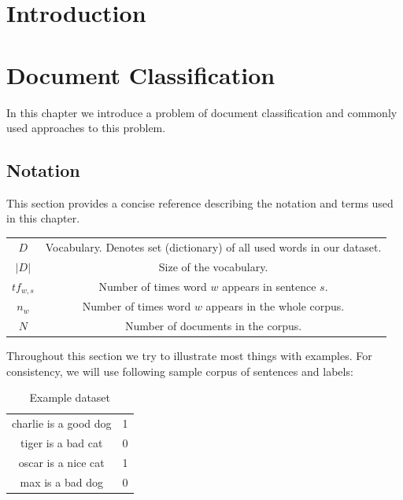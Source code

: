 \chapter*{Introduction}


\chapter{Document Classification}
    In this chapter we introduce a problem of document classification and commonly used approaches to this problem.
    \* %
    
    \section{Notation}
        This section provides a concise reference describing the notation and terms used in this chapter. 
        \* %
        
        \begin{table}[]
            \centering
            \begin{tabular}{c c}
                $D$ & Vocabulary. Denotes set (dictionary) of all used words in our dataset. \\
                $|D|$ & Size of the vocabulary. \\
                $tf_{w,s}$ & Number of times word $w$ appears in sentence $s$. \\
                $n_w$ & Number of times word $w$ appears in the whole corpus. \\
                $N$ & Number of documents in the corpus.
            \end{tabular}
        \end{table}
        
        Throughout this section we try to illustrate most things with examples. 
        For consistency, we will use following sample corpus of sentences and labels:
        
        \begin{table}[]
            \centering
            \begin{tabular}{c|c}
            \hline
                charlie is a good dog & 1 \\
                tiger is a bad cat & 0 \\
                oscar is a nice cat & 1 \\
                max is a bad dog & 0 \\
            \end{tabular}
            \caption{Example dataset}
            \label{tab:example:dataset}

        \end{table}
        

